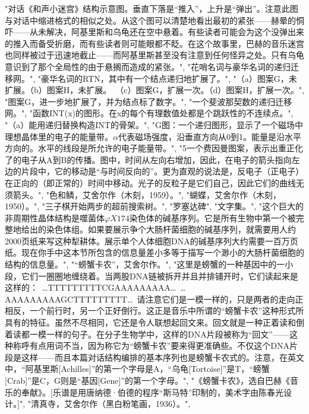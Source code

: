 "对话《和声小迷宫》结构示意图。垂直下落是“推入”，上升是“弹出”。注意此图与对话中缩进格式的相似之处。从这个图可以清楚地看出最初的紧张——赫晕的恫吓——从未解决，阿基里斯和乌龟还在空中悬着。有些读者可能会为这个没弹出来的推入而备受折磨，而有些读者则可能眼都不眨。在这个故事里，巴赫的音乐迷宫也同样被过于迅速地截止——而阿基里斯甚至没有注意到任何怪异之处。只有乌龟意识到了那个全局性的由于悬搁而造成的紧张。",
"花哨名词与豪华名词的递归迁移网。",
"豪华名词的RTN，其中有一个结点递归地扩展了。",
"（a）图案G，未扩展。\hspace {3em}（b）图案H，未扩展。\protect \ （c）图案G，扩展一次。\hspace {2.25em}（d）图案H，扩展一次。",
"图案G，进一步地扩展了，并为结点标了数字。",
"一个斐波那契数的递归迁移网。",
"\label {fig:32}函数INT(x)的图形。在x的每个有理数值处都是个跳跃性的不连续点。",
"\label {fig:33}（a）能用递归替换构造INT的骨架。",
"\label {fig:34}G图：一个递归图形，显示了一个磁场中理想晶体里的电子的能量带。$\alpha $代表磁场强度，沿垂直方向从0到1。能量是沿水平方向的。水平的线段是所允许的电子能量带。",
"\textcircled {\tiny {5}}一个费因曼图案，表示出重正化了的电子从A到B的传播。图中，时间从左向右增加，因此，在电子的箭头指向左边的片段中，它的移动是“与时间反向的”。更为直观的说法是，反电子（正电子）在正向的（即正常的）时间中移动。光子的反粒子是它们自己，因此它们的曲线无须箭头。",
"色和鳞，艾舍尔作（木刻，1959）。",
"蝴蝶，艾舍尔作（木刻，1950）。",
"\label {fig:38}三子棋开始两步的超前搜索树。",
"罗塞达碑",
"文字集。",
"\label {fig:41}这个巨大的非周期性晶体结构是噬菌体$\varphi X174$染色体的碱基序列。它是所有生物中第一个被完整地给出的染色体组。如果要展示争个大肠杆菌细胞的碱基序列，就需要用人约2000页纸来写这种犁耕体。展示单个人体细胞DNA的碱基序列大约需要一百万页纸。现在你手中这本节所包含的信息量差小多等于描写一个渺小的大肠杆菌细胞的结构的信息量。",
"\label {fig:42}“螃蟹卡农”，艾舍尔作。",
"\label {fig:43}这里是螃蟹的一种基因中的一小段，它们一圈圈地缠绕着。当两股DNA链被拆开并且并排铺开时，它们读起来是这样的：\protect \ …TTTTTTTTTCGAAAAAAAAA…\protect \ …AAAAAAAAAGCTTTTTTTTT…\protect \ 请注意它们是一模一样的，只是两者的走向正相反，一个前行时，另一个正好倒行。这正是音乐中所谓的“螃蟹卡农”这种形式所具有的特征。虽然不尽相同，它还是令人联想起回文来。回文就是一种正着读和倒着读都一模一样的句子。在分子生物学中，这样的DNA片段被称为“回文”——这种称呼有点用词不当，因为称它为“螃蟹卡农”要来得更准确些。不仅这个DNA片段是这样——而且本篇对话结构编排的基本序列也是螃蟹卡农式的。注意，在英文中，“阿基里斯[Achilles]”的第一个字母是A，“乌龟[Tortoise]”是T，“螃蟹[Crab]”是C，G则是“基因[Gene]”的第一个字母。",
"《螃蟹卡农》，选自巴赫《音乐的奉献》。[乐谱是用唐纳德·伯德的程序“斯马特”印制的，美术字由陈春光设计。]",
"清真寺，艾舍尔作（黑白粉笔画，1936）。",
